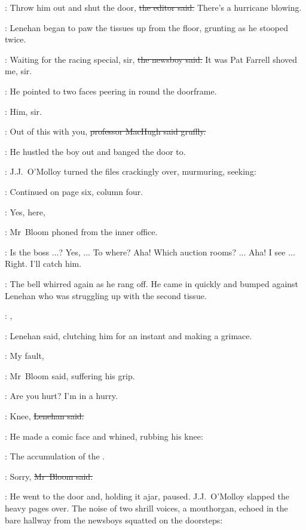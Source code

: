 \crawford:
Throw him out and shut the door,
\sout{the editor said.}
There's a hurricane blowing.%

:
Lenehan began to paw the tissues up from the floor,
grunting as he stooped twice.

\boy:
Waiting for the racing special, sir,
\sout{the newsboy said.}
It was Pat Farrell shoved me, sir.

:
He pointed to two faces peering in round the doorframe.

\boy:
Him, sir.

\machugh:
Out of this with you,
\sout{professor MacHugh said gruffly.}

:
He hustled the boy out and banged the door to.

:
J.J.~O'Molloy turned the files crackingly over,
murmuring,
seeking:

\jjom:
Continued on page six, column four.

\Bloom:
Yes,  here,

:
Mr~Bloom phoned from the inner office.

\Bloom:
Is the boss ...?
Yes,  ...
To where?
Aha!
Which auction rooms? ...
Aha!
I see ...
Right.
I'll catch him.



:
The bell whirred again as he rang off.
He came in quickly and bumped against Lenehan
who was struggling up with the second tissue.

\lenehan:
,

:
Lenehan said,
clutching him for an instant
and making a grimace.

\Bloom:
My fault,

:
Mr~Bloom said,
suffering his grip.

\Bloom:
Are you hurt?
I'm in a hurry.

\lenehan:
Knee,
\sout{Lenehan said.}

:
He made a comic face and whined,
rubbing his knee:

\lenehan:
The accumulation of the .

\Bloom:
Sorry,
\sout{Mr~Bloom said.}

:
He went to the door
and, holding it ajar,
paused.
J.J.~O'Molloy slapped the heavy pages over.
The noise of two shrill voices,
a mouthorgan,
echoed in the bare hallway
from the newsboys squatted on the doorsteps:

